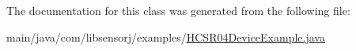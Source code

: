 The documentation for this class was generated from the following file\+:\begin{DoxyCompactItemize}
\item 
main/java/com/libsensorj/examples/\hyperlink{HCSR04DeviceExample_8java}{H\+C\+S\+R04\+Device\+Example.\+java}\end{DoxyCompactItemize}
